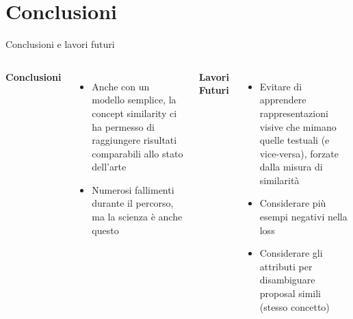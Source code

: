 \documentclass{beamer}
\begin{document}
\section{Conclusioni}

\begin{frame}{Conclusioni e lavori futuri}
  \begin{columns}
      \textbf{Conclusioni}
      \begin{itemize}
        \item Anche con un modello semplice, la concept similarity ci
        ha permesso di raggiungere risultati \alert{comparabili} allo
        stato dell'arte
        \item Numerosi \alert{fallimenti} durante il percorso, ma la
        scienza è anche questo
      \end{itemize}
      \textbf{Lavori Futuri}
      \begin{itemize}
        \item Evitare di apprendere \alert{rappresentazioni visive che
        mimano} quelle testuali (e vice-versa), forzate dalla misura
        di similarità
        \item Considerare più \alert{esempi negativi} nella loss
        \item Considerare gli \alert{attributi} per disambiguare
        proposal simili (stesso concetto)
      \end{itemize}
  \end{columns}
\end{frame}
\end{document}
